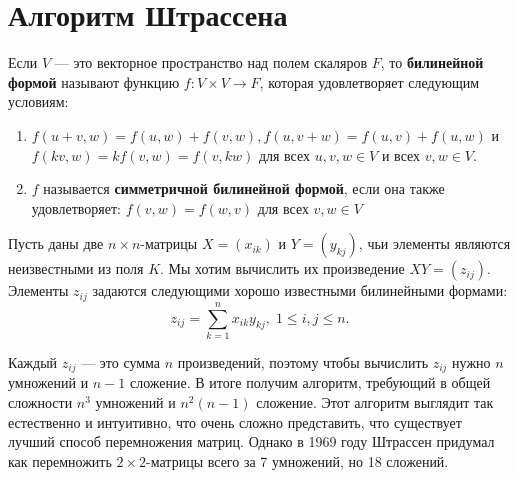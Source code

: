\section{Алгоритм Штрассена}\label{Strassen_algorithm}

\begin{definition}\cite{wiki:bf}
	Если $V$ --- это векторное пространство над полем скаляров $F$, то \textbf{билинейной формой} называют функцию $f: V \times V \to F$, которая удовлетворяет следующим условиям:
	\begin{enumerate}[(1)]
	     \item $f(u + v, w) = f(u, w) + f(v, w), f(u, v + w) = f(u, v) + f(u, w)$ и $f(kv, w) = kf(v, w) = f(v, kw)$ для всех $u, v, w \in V$ и всех $v, w \in V$.
	     \item $f$ называется \textbf{симметричной билинейной формой}, если она также удовлетворяет:
	     $f(v, w) = f(w, v)$ для всех $v, w \in V$
	\end{enumerate}
\end{definition}

Пусть даны две $n \times n$-матрицы $X=(x_{ik})$ и $Y=(y_{kj})$, чьи элементы являются неизвестными из поля $K$. Мы хотим вычислить их произведение $XY=(z_{ij})$. Элементы $z_{ij}$ задаются следующими хорошо известными билинейными формами:
\[
	z_{ij}= \sum\limits_{k=1}^{n} x_{ik} y_{kj}, \; 1 \leq i,j \leq n.
\]

Каждый $z_{ij}$ --- это сумма $n$ произведений, поэтому чтобы вычислить $z_{ij}$ нужно $n$ умножений и $n-1$ сложение. В итоге получим алгоритм, требующий в общей сложности $n^3$ умножений и $n^2(n-1)$ сложение. Этот алгоритм выглядит так естественно и интуитивно, что очень сложно представить, что существует лучший способ перемножения матриц. Однако в 1969 году Штрассен \cite{Strassen:1969} придумал как перемножить $2 \times 2$-матрицы всего за 7 умножений, но 18 сложений.

